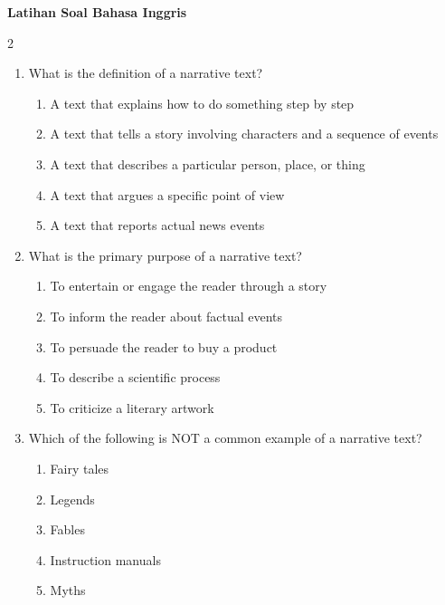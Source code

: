 \documentclass[10pt,a4paper]{article}
\begin{document}
\begin{center}
  \textbf{\Large Latihan Soal Bahasa Inggris}
\end{center}
\vspace{0.3cm}

\begin{multicols}{2}
  
  \begin{enumerate}
    \item What is the definition of a narrative text?
    \begin{enumerate}
      \item A text that explains how to do something step by step
      \item A text that tells a story involving characters and a sequence of events
      \item A text that describes a particular person, place, or thing
      \item A text that argues a specific point of view
      \item A text that reports actual news events
    \end{enumerate}

    \item What is the primary purpose of a narrative text?
    \begin{enumerate}
      \item To entertain or engage the reader through a story
      \item To inform the reader about factual events
      \item To persuade the reader to buy a product
      \item To describe a scientific process
      \item To criticize a literary artwork
    \end{enumerate}

    \item Which of the following is NOT a common example of a narrative text?
    \begin{enumerate}
      \item Fairy tales
      \item Legends
      \item Fables
      \item Instruction manuals
      \item Myths
    \end{enumerate}


\end{enumerate}
\end{multicols}
\end{document}
